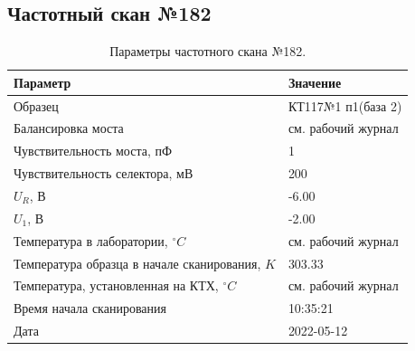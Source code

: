 \subsection{Частотный скан №182}
\begin{table}[!ht]
    \centering
    \caption{Параметры частотного скана №182.}
    \begin{tabular}{|l|l|}
        \hline
        Параметр                                       & Значение                  \\ \hline
        Образец                                        & КТ117№1 п1(база 2)        \\ \hline
        Балансировка моста                             & см. рабочий журнал        \\ \hline
        Чувствительность моста, пФ                     & 1                         \\ \hline
        Чувствительность селектора, мВ                 & 200                       \\ \hline
        $U_R$, В                                       & -6.00                     \\ \hline
        $U_1$, В                                       & -2.00                     \\ \hline
        Температура в лаборатории, $^\circ C$          & см. рабочий журнал        \\ \hline
        Температура образца в начале сканирования, $K$ & 303.33                    \\ \hline
        Температура, установленная на КТХ, $^\circ C$  & см. рабочий журнал        \\ \hline
        Время начала сканирования                      & 10:35:21                  \\ \hline
        Дата                                           & 2022-05-12                \\ \hline
    \end{tabular}
    \label{table:frequency_scan_182}
\end{table}

